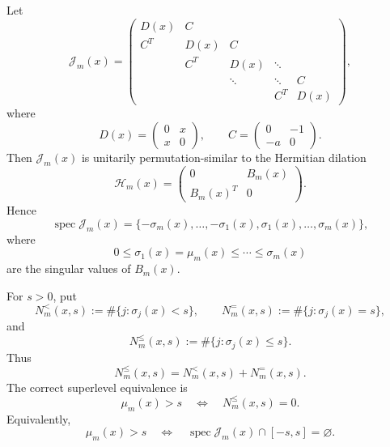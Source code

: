 \documentclass[11pt]{amsart}
\numberwithin{equation}{section}
\DeclareMathOperator{\spec}{spec}
\begin{document}
Let
\[
        \mathcal J_m(x)
        =
        \begin{pmatrix}
        D(x)&C&&&\\
        C^T&D(x)&C&&\\
        &C^T&D(x)&\ddots&\\
        &&\ddots&\ddots&C\\
        &&&C^T&D(x)
        \end{pmatrix},
\]
where
\[
        D(x)=
        \begin{pmatrix}
        0&x\\
        x&0
        \end{pmatrix},
        \qquad
        C=
        \begin{pmatrix}
        0&-1\\
        -a&0
        \end{pmatrix}.
\]
Then \(\mathcal J_m(x)\) is unitarily permutation-similar to the Hermitian
dilation
\[
        \mathcal H_m(x)
        =
        \begin{pmatrix}
        0&B_m(x)\\
        B_m(x)^T&0
        \end{pmatrix}.
\]
Hence
\[
        \spec\mathcal J_m(x)
        =
        \{-\sigma_m(x),\dots,-\sigma_1(x),
          \sigma_1(x),\dots,\sigma_m(x)\},
\]
where
\[
        0\le \sigma_1(x)=\mu_m(x)\le\cdots\le\sigma_m(x)
\]
are the singular values of \(B_m(x)\).

For \(s>0\), put
\[
        N_m^{<}(x,s)
        :=
        \#\{j:\sigma_j(x)<s\},
        \qquad
        N_m^{=}(x,s)
        :=
        \#\{j:\sigma_j(x)=s\},
\]
and
\[
        N_m^{\le}(x,s)
        :=
        \#\{j:\sigma_j(x)\le s\}.
\]
Thus
\[
        N_m^{\le}(x,s)=N_m^{<}(x,s)+N_m^{=}(x,s).
\]
The correct superlevel equivalence is
\[
        \mu_m(x)>s
        \quad\Longleftrightarrow\quad
        N_m^{\le}(x,s)=0.
\]
Equivalently,
\[
        \mu_m(x)>s
        \quad\Longleftrightarrow\quad
        \spec\mathcal J_m(x)\cap[-s,s]=\varnothing.
\]
\end{document}
